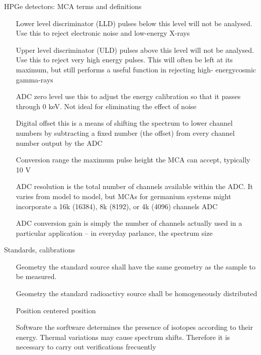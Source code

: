 \begin{frame}{HPGe detectors: MCA terms and definitions}





{\scriptsize 
\begin{itemize}[leftmargin=3.5cm]
\item[Lower level discriminator (LLD)] pulses below this level will not be analysed. Use this to reject electronic noise and low-energy X-rays
\item [Upper level discriminator (ULD)] pulses above this level will not be analysed. Use this to reject very high energy pulses. This will often be left at its maximum, but still performs a useful function in rejecting high- energycosmic gamma-rays
\item [ADC zero level]  use this to adjust the energy calibration so that it passes through 0 keV. Not ideal for eliminating the effect of noise
\item [Digital offset] this is a means of shifting the spectrum to lower channel numbers by subtracting a fixed number (the offset) from every channel number output by the ADC 
\item [Conversion range] the maximum pulse height the MCA can accept, typically 10 V
\item [ADC resolution] is the total number of channels available within the ADC. It varies from model to model, but MCAs for germanium systems might incorporate a 16k (16384), 8k (8192), or 4k (4096) channels ADC
\item [ADC conversion gain] is simply the number of channels actually used in a particular application – in everyday parlance, the spectrum size
\end{itemize}
}




\end{frame}

\begin{frame}{Standards, calibrations}

{\small
\begin{itemize}[leftmargin=3cm]
\item[Geometry] the standard source shall have the same geometry as the sample to be measured. 
\item[Geometry] the standard radioactivy source shall be homogeneously distributed 
\item[Position] centered position
\item[Software] the sorftware determines the presence of isotopes according to their energy. Thermal variations may cause spectrum shifts. Therefore it is necessary to carry out verifications frecuently
\end{itemize}
}

\end{frame}

